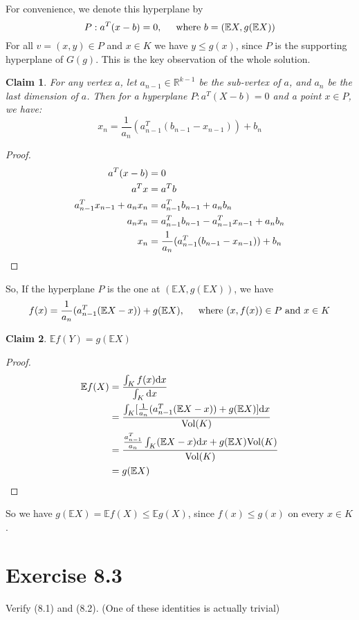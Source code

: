 \documentclass{article}
\newtheorem{claim}{Claim}
\begin{document}
For convenience, we denote this hyperplane by
\[P: a^T (x - b) = 0, \hspace{0.5cm} \mbox{where $b = (\mathbb{E} X, g(\mathbb{E} X))$}\]
For all $v = (x, y)\in P$ and $x\in K$ we have $y \leq g(x)$, since $P$ is the supporting hyperplane of $G(g)$.
This is the key observation of the whole solution.
\begin{claim}
  For any vertex $a$, let $a_{n-1} \in \mathbb{R}^{k-1}$ be the sub-vertex of $a$, and $a_n$ be the last dimension of $a$. Then for a hyperplane $P: a^T(X - b) = 0$ and a point $x\in P$, we have:
  \[x_n = \frac{1}{a_n}(a_{n-1}^T (b_{n-1} - x_{n-1})) + b_n\]
\end{claim}
\begin{proof}
  \begin{align*}
    a^T(x - b) &= 0 \\
    a^Tx &= a^Tb \\
    a_{n-1}^Tx_{n-1} + a_nx_n &= a_{n-1}^Tb_{n-1} + a_nb_n \\
    a_nx_n &= a_{n-1}^Tb_{n-1} - a_{n-1}^Tx_{n-1} + a_nb_n \\
    x_n &= \frac{1}{a_n}(a_{n-1}^T(b_{n-1} - x_{n-1})) + b_n \qedhere
  \end{align*}
\end{proof}
So, If the hyperplane $P$ is the one at $(\mathbb{E} X, g(\mathbb{E} X))$, we have
\[f(x) = \frac{1}{a_n}(a_{n-1}^T(\mathbb{E} X - x)) + g(\mathbb{E} X), \hspace{0.5cm} \mbox{where $(x, f(x)) \in P$ and $x\in K$}\]
\begin{claim}
$\mathbb{E}f(Y) = g(\mathbb{E}X)$
\end{claim}
\begin{proof}
  \begin{align*}
    \mathbb{E}f(X) &= \frac{\int_K f(x) \mathrm{d}x}{\int_K \mathrm{d}x} \\
    &= \frac{
    \int_K [\frac{1}{a_n}(a_{n-1}^T(\mathbb{E}X - x)) + g(\mathbb{E} X)] \mathrm{d}x
     } {\mathrm{Vol}(K)} \\
    &= \frac{
\frac{a_{n-1}^T}{a_n}\int_K(\mathbb{E}X - x)\mathrm{d}x + g(\mathbb{E} X)\mathrm{Vol}(K)}{\mathrm{Vol}(K)} \\
    &= g(\mathbb{E} X) \qedhere
  \end{align*}
\end{proof}
So we have $g(\mathbb{E} X) = \mathbb{E}f(X) \leq \mathbb{E}g(X)$, since $f(x) \leq g(x)$ on every $x\in K$.

\section{Exercise 8.3}
Verify (8.1) and (8.2). (One of these identities is actually trivial)
\end{document}
